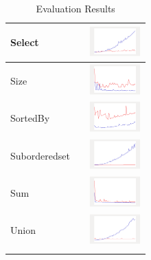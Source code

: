 \begin{longtable}{ m{2.5cm} m{8cm} m{2cm} }
Select &

&
\includegraphics[width=2cm]{../graphs/orderedset/small/Select}
\\\hline

Size &

&
\includegraphics[width=2cm]{../graphs/orderedset/small/Size}
\\\hline

SortedBy &

&
\includegraphics[width=2cm]{../graphs/orderedset/small/sortedBy}
\\\hline

Suborderedset &

&
\includegraphics[width=2cm]{../graphs/orderedset/small/Suborderedset}
\\\hline

Sum &

&
\includegraphics[width=2cm]{../graphs/orderedset/small/Sum}
\\\hline

Union &

&
\includegraphics[width=2cm]{../graphs/orderedset/small/Union}
\\\hline
  
\caption{Evaluation Results }
\label{tab:resultsFull}
\end{longtable}


